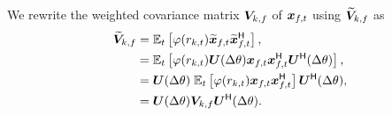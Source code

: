 \documentclass[sip,biber]{now-journal}
\begin{document}
We rewrite the weighted covariance matrix ${\bm{V}} _{k,f}$ of $\Obs _{\ft}$ using $\widetilde{\bm{V}} _{k,f}$ as
\begin{align}
  \refpos{\cov} _{\src,\freq} &= \expct  _{\tframe} \left[\weight (\var _{\src,\tframe}) \refpos{\Obs} _{\ft} \refpos{\Obs} _{\ft} ^{\hermite}\right], \\
                     &= \expct  _{\tframe} \left[\weight (\var _{\src,\tframe}) \rotMat (\Delta\rotSpat) {\Obs} _{\ft} {\Obs} _{\ft} ^{\hermite} \rotMat ^{\hermite} (\Delta\rotSpat)\right], \\
                     &= \rotMat (\Delta\rotSpat)\; \expct  _{\tframe} \left[\weight (\var _{\src,\tframe}) {\Obs} _{\ft} {\Obs} _{\ft} ^{\hermite} \right] \rotMat ^{\hermite} (\Delta\rotSpat), \\
                     &= \rotMat (\Delta\rotSpat) {\cov} _{\src,\freq} \rotMat ^{\hermite} (\Delta\rotSpat). \label{eq:cov:refpos:batch}
\end{align}
\end{document}
